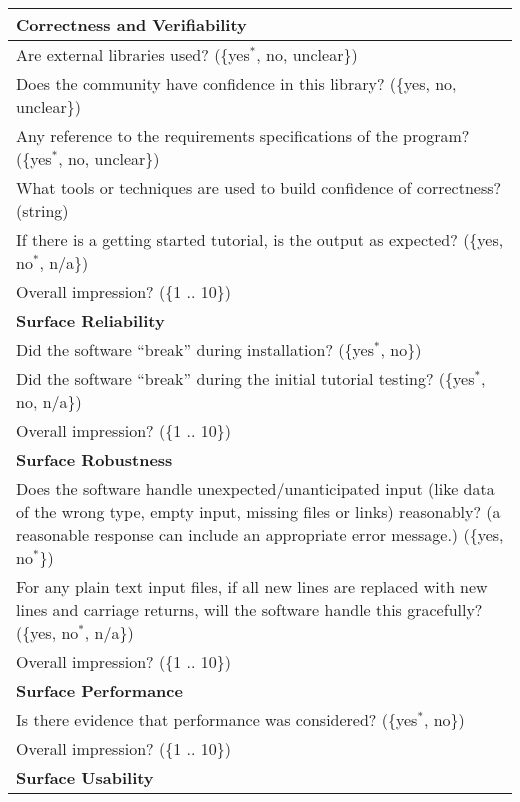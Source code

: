 \begin{longtable}{p{16cm}}
  \midrule
  \textbf{Correctness and Verifiability}\\
  \midrule

  Are external libraries used? (\{yes$^*$, no, unclear\})\\
  Does the community have confidence in this library? (\{yes, no, unclear\})\\
  Any reference to the requirements specifications of the program?
  (\{yes$^*$, no, unclear\})\\
  What tools or techniques are used to build confidence of correctness? (string)\\
  If there is a getting started tutorial, is the output as expected? (\{yes, no$^*$, n/a\})\\
  Overall impression? (\{1 .. 10\})\\

  \midrule
  \textbf{Surface Reliability}\\
  \midrule

  Did the software ``break'' during installation? (\{yes$^*$, no\})\\
  Did the software ``break'' during the initial tutorial testing? (\{yes$^*$, no, n/a\})\\
  Overall impression? (\{1 .. 10\})\\

  \midrule
  \textbf{Surface Robustness}\\
  \midrule

  Does the software handle unexpected/unanticipated input (like data of the wrong type, empty
  input, missing files or links) reasonably? (a reasonable response can include
  an appropriate error message.) (\{yes, no$^*$\})\\
  For any plain text input files, if all new lines are replaced with new lines
  and carriage returns, will the software handle this gracefully? (\{yes,
  no$^*$, n/a\})\\
  Overall impression? (\{1 .. 10\})\\

  \midrule
  \textbf{Surface Performance}\\
  \midrule

  Is there evidence that performance was considered? (\{yes$^*$, no\})\\
  Overall impression? (\{1 .. 10\})\\

  \midrule
  \textbf{Surface Usability}\\
  \midrule


\end{longtable}
